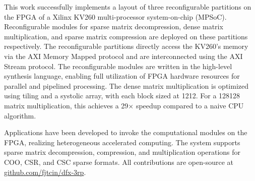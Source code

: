 

\begin{abstract}
本工作在Xilinx KV260多处理器系统芯片的FPGA上，成功实现了3个可重构分区的布局，并在上面分别部署了稀疏矩阵解压、稠密矩阵乘法、稀疏矩阵压缩的可重构模块。
可重构分区通过AXIMM协议对KV260的内存直接访问，同时通过AXIS协议进行互联。
可重构模块使用高层次综合语言编写，能充分利用FPGA的硬件资源，实现并行、流水线地处理。
稠密矩阵乘法使用分块与脉动阵列优化，每个块大小12\texttimes{}12，对于128\texttimes{}128矩阵乘法相较CPU朴素算法实现了29\texttimes{}的加速比。

在KV260的CPU上，编写程序调用FPGA上的计算模块，实现了异构加速计算。
支持COO, CSR和CSC三种稀疏格式的稀疏矩阵解压/压缩/乘法操作。所有贡献开源于\url{github.com/fjtcin/dfx-3rp}。
\end{abstract}

\begin{abstract*}
This work successfully implements a layout of three reconfigurable partitions on the FPGA of a Xilinx KV260 multi-processor system-on-chip (MPSoC).
Reconfigurable modules for sparse matrix decompression, dense matrix multiplication, and sparse matrix compression are deployed on these partitions respectively.
The reconfigurable partitions directly access the KV260's memory via the AXI Memory Mapped protocol and are interconnected using the AXI Stream protocol.
The reconfigurable modules are written in the high-level synthesis language,
enabling full utilization of FPGA hardware resources for parallel and pipelined processing.
The dense matrix multiplication is optimized using tiling and a systolic array, with each block sized at 12\texttimes{}12.
For a 128\texttimes{}128 matrix multiplication, this achieves a 29× speedup compared to a naive CPU algorithm.

Applications have been developed to invoke the computational modules on the FPGA,
realizing heterogeneous accelerated computing. The system supports sparse matrix decompression,
compression, and multiplication operations for COO, CSR, and CSC sparse formats. All contributions are open-source at \url{github.com/fjtcin/dfx-3rp}.
\end{abstract*}
